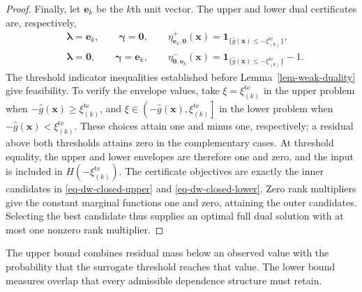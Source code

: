 \documentclass[review,11pt,3p,authoryear,nopreprintline]{elsarticle}
\begin{document}
\begin{proof}
  Finally, let $\bm e_k$ be the $k$th unit vector. The upper and lower dual certificates are, respectively,
  \begin{align*}
    &\bm\lambda=\bm e_k,\qquad \bm\gamma=\bm 0,\qquad
      \eta^+_{\bm e_k,\bm 0}(\bm x)
      =\mathbf1_{\{\hat g(\bm x)\le-\xi_{(k)}^{\mathrm{te}}\}},\\
    &\bm\lambda=\bm 0,\qquad \bm\gamma=\bm e_k,\qquad
      \eta^-_{\bm 0,\bm e_k}(\bm x)
      =\mathbf1_{\{\hat g(\bm x)\le-\xi_{(k)}^{\mathrm{te}}\}}-1.
  \end{align*}
  The threshold indicator inequalities established before Lemma~\ref{lem-weak-duality} give feasibility. To verify the envelope values, take $\xi=\xi_{(k)}^{\mathrm{te}}$ in the upper problem when $-\hat g(\bm x)\ge\xi_{(k)}^{\mathrm{te}}$, and $\xi\in\left(-\hat g(\bm x),\xi_{(k)}^{\mathrm{te}}\right]$ in the lower problem when $-\hat g(\bm x)<\xi_{(k)}^{\mathrm{te}}$. These choices attain one and minus one, respectively; a residual above both thresholds attains zero in the complementary cases. At threshold equality, the upper and lower envelopes are therefore one and zero, and the input is included in $H\left(-\xi_{(k)}^{\mathrm{te}}\right)$. The certificate objectives are exactly the inner candidates in \eqref{eq-dw-closed-upper} and \eqref{eq-dw-closed-lower}. Zero rank multipliers give the constant marginal functions one and zero, attaining the outer candidates. Selecting the best candidate thus supplies an optimal full dual solution with at most one nonzero rank multiplier.
\end{proof}

The upper bound combines residual mass below an observed value with the probability that the surrogate threshold reaches that value. The lower bound measures overlap that every admissible dependence structure must retain.
\end{document}
